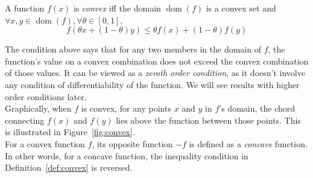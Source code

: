 \documentclass{article}
\DeclareMathOperator*{\dom}{dom}
\begin{document}
\begin{defn}
A function $f(x)$ is \emph{convex} iff the domain $\dom(f)$ is a convex set and $\forall x,y \in \dom(f), \forall \theta \in [0,1]$,
\[
	f(\theta x+ (1-\theta)y) \leq \theta f(x) + (1-\theta)f(y)
\]
\label{def:convex}
\end{defn}

The condition above says that for any two members in the domain of $f$, the function's value on a convex combination does not exceed the convex combination of those values. It can be viewed as a \textit{zeroth order condition}, as it doesn't involve any condition of differentiability of the function. We will see results with higher order conditions later.\\
Graphically, when $f$ is convex, for any points $x$ and $y$ in $f$'s domain, the chord connecting $f(x)$ and $f(y)$ lies above the function between those points. This is illustrated in Figure~\ref{fig:convex}.\\

For a convex function $f$, its opposite function $-f$ is defined as a \emph{concave} function. In other words, for a concave function, the inequality condition in Definition~\ref{def:convex} is reversed.\\
\end{document}
